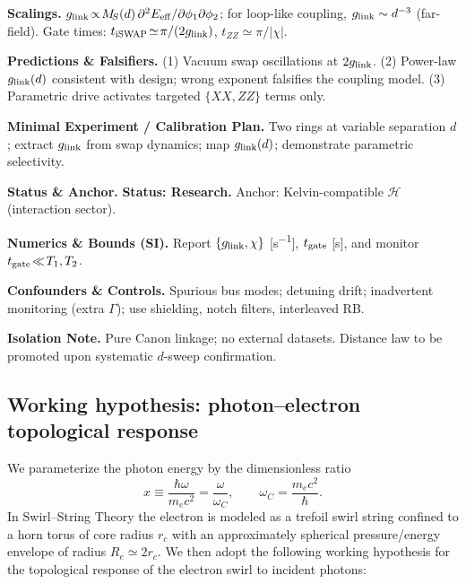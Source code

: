 \documentclass[10pt,reprint,aps,onecolumn,nofootinbib]{revtex4-2}
\begin{document}
    \textbf{Scalings.}
    $g_{\rm link}\!\propto\! M_{\!S}(d)\,\partial^2 E_{\rm eff}/\partial\phi_1 \partial\phi_2$; for loop-like coupling, $g_{\rm link}\sim d^{-3}$ (far-field). Gate times: $t_{\rm iSWAP}\!\simeq\!\pi/(2 g_{\rm link})$, $t_{ZZ}\!\simeq\!\pi/|\chi|$.

    \textbf{Predictions \& Falsifiers.}
    (1) Vacuum swap oscillations at $2g_{\rm link}$. (2) Power-law $g_{\rm link}(d)$ consistent with design; wrong exponent falsifies the coupling model. (3) Parametric drive activates targeted $\{XX,ZZ\}$ terms only.

    \textbf{Minimal Experiment / Calibration Plan.}
    Two rings at variable separation $d$; extract $g_{\rm link}$ from swap dynamics; map $g_{\rm link}(d)$; demonstrate parametric selectivity.

    \textbf{Status \& Anchor.}
    \textbf{Status: Research.} Anchor: Kelvin-compatible $\mathcal H$ (interaction sector).

    \textbf{Numerics \& Bounds (SI).}
    Report $\{g_{\rm link},\chi\}$ [\si{s^{-1}}], $t_{\rm gate}$ [\si{s}], and monitor $t_{\rm gate}\!\ll\! T_1,T_2$.

    \textbf{Confounders \& Controls.}
    Spurious bus modes; detuning drift; inadvertent monitoring (extra $\Gamma$); use shielding, notch filters, interleaved RB.

    \textbf{Isolation Note.}
    Pure Canon linkage; no external datasets. Distance law to be promoted upon systematic $d$-sweep confirmation.


    \subsection{Working hypothesis: photon--electron topological response}

        We parameterize the photon energy by the dimensionless ratio
        \begin{equation}
            x \equiv \frac{\hbar\omega}{m_e c^2}
            = \frac{\omega}{\omega_C},
            \qquad
            \omega_C = \frac{m_e c^2}{\hbar}.
        \end{equation}
        In Swirl--String Theory the electron is modeled as a trefoil swirl string
        confined to a horn torus of core radius $r_c$ with an approximately
        spherical pressure/energy envelope of radius $R_e\simeq 2 r_c$.  We then
        adopt the following working hypothesis for the topological response of
        the electron swirl to incident photons:
\end{document}
